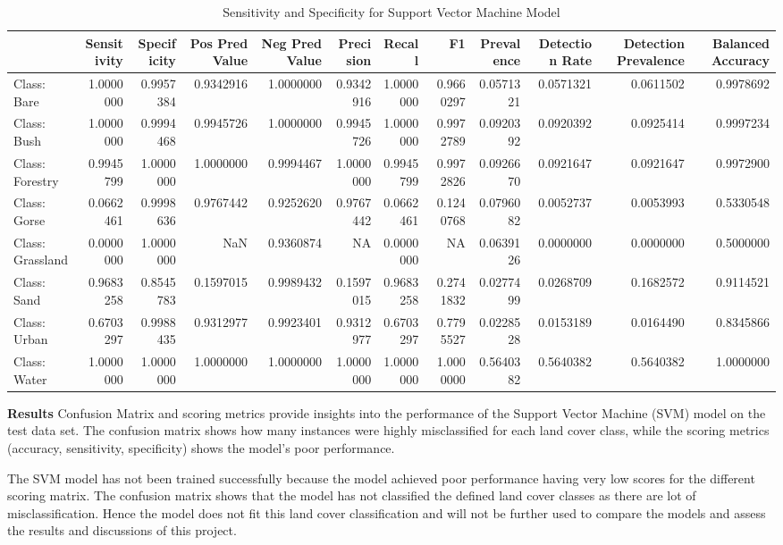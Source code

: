 \documentclass[
]{article}
\begin{document}
\begin{longtable}[l]{lrrrrrrrrrrr}
\caption{\label{tab:svm_confusion_matrix}Sensitivity and Specificity for Support Vector Machine Model}\\
\toprule
 & Sensitivity & Specificity & Pos Pred Value & Neg Pred Value & Precision & Recall & F1 & Prevalence & Detection Rate & Detection Prevalence & Balanced Accuracy\\
\midrule
Class: Bare & 1.0000000 & 0.9957384 & 0.9342916 & 1.0000000 & 0.9342916 & 1.0000000 & 0.9660297 & 0.0571321 & 0.0571321 & 0.0611502 & 0.9978692\\
Class: Bush & 1.0000000 & 0.9994468 & 0.9945726 & 1.0000000 & 0.9945726 & 1.0000000 & 0.9972789 & 0.0920392 & 0.0920392 & 0.0925414 & 0.9997234\\
Class: Forestry & 0.9945799 & 1.0000000 & 1.0000000 & 0.9994467 & 1.0000000 & 0.9945799 & 0.9972826 & 0.0926670 & 0.0921647 & 0.0921647 & 0.9972900\\
Class: Gorse & 0.0662461 & 0.9998636 & 0.9767442 & 0.9252620 & 0.9767442 & 0.0662461 & 0.1240768 & 0.0796082 & 0.0052737 & 0.0053993 & 0.5330548\\
Class: Grassland & 0.0000000 & 1.0000000 & NaN & 0.9360874 & NA & 0.0000000 & NA & 0.0639126 & 0.0000000 & 0.0000000 & 0.5000000\\
\addlinespace
Class: Sand & 0.9683258 & 0.8545783 & 0.1597015 & 0.9989432 & 0.1597015 & 0.9683258 & 0.2741832 & 0.0277499 & 0.0268709 & 0.1682572 & 0.9114521\\
Class: Urban & 0.6703297 & 0.9988435 & 0.9312977 & 0.9923401 & 0.9312977 & 0.6703297 & 0.7795527 & 0.0228528 & 0.0153189 & 0.0164490 & 0.8345866\\
Class: Water & 1.0000000 & 1.0000000 & 1.0000000 & 1.0000000 & 1.0000000 & 1.0000000 & 1.0000000 & 0.5640382 & 0.5640382 & 0.5640382 & 1.0000000\\
\bottomrule
\end{longtable}

\textbf{Results} Confusion Matrix and scoring metrics provide insights
into the performance of the Support Vector Machine (SVM) model on the
test data set. The confusion matrix shows how many instances were highly
misclassified for each land cover class, while the scoring metrics
(accuracy, sensitivity, specificity) shows the model's poor performance.

The SVM model has not been trained successfully because the model
achieved poor performance having very low scores for the different
scoring matrix. The confusion matrix shows that the model has not
classified the defined land cover classes as there are lot of
misclassification. Hence the model does not fit this land cover
classification and will not be further used to compare the models and
assess the results and discussions of this project.
\end{document}
